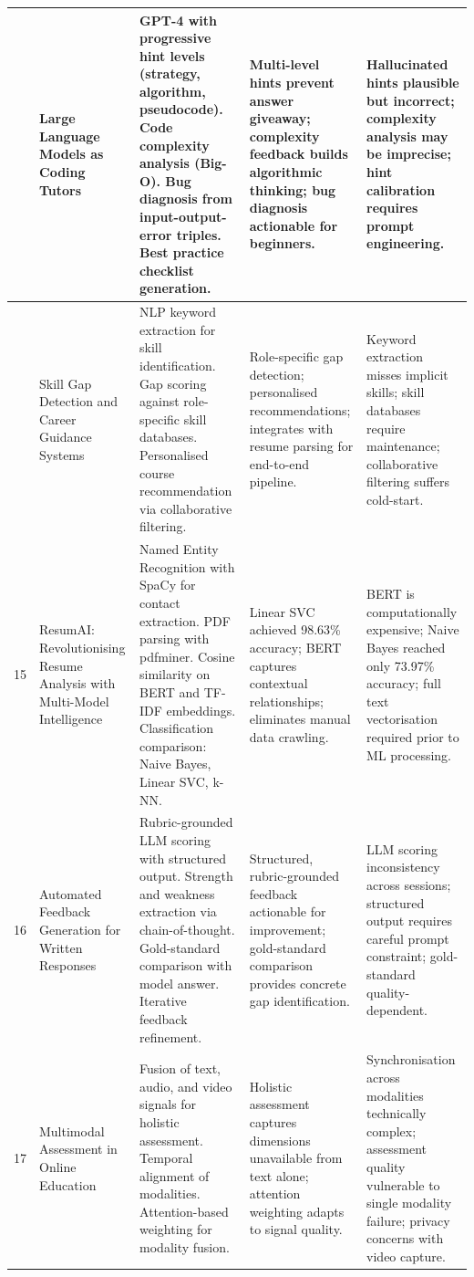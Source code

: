 \documentclass[12pt,a4paper]{report}
\begin{document}
\begin{longtable}{|>{\centering\arraybackslash}p{0.6cm}|p{3.1cm}|p{3.6cm}|p{3.2cm}|p{3.2cm}|}
13 & Large Language Models as Coding Tutors \cite{ref13} &
GPT-4 with progressive hint levels (strategy, algorithm, pseudocode). Code complexity analysis (Big-O). Bug diagnosis from input-output-error triples. Best practice checklist generation. &
Multi-level hints prevent answer giveaway; complexity feedback builds algorithmic thinking; bug diagnosis actionable for beginners. &
Hallucinated hints plausible but incorrect; complexity analysis may be imprecise; hint calibration requires prompt engineering. \\
\hline

14 & Skill Gap Detection and Career Guidance Systems \cite{ref14} &
NLP keyword extraction for skill identification. Gap scoring against role-specific skill databases. Personalised course recommendation via collaborative filtering. &
Role-specific gap detection; personalised recommendations; integrates with resume parsing for end-to-end pipeline. &
Keyword extraction misses implicit skills; skill databases require maintenance; collaborative filtering suffers cold-start. \\
\hline

15 & ResumAI: Revolutionising Resume Analysis with Multi-Model Intelligence \cite{ref15} &
Named Entity Recognition with SpaCy for contact extraction. PDF parsing with pdfminer. Cosine similarity on BERT and TF-IDF embeddings. Classification comparison: Naive Bayes, Linear SVC, k-NN. &
Linear SVC achieved 98.63\% accuracy; BERT captures contextual relationships; eliminates manual data crawling. &
BERT is computationally expensive; Naive Bayes reached only 73.97\% accuracy; full text vectorisation required prior to ML processing. \\
\hline

16 & Automated Feedback Generation for Written Responses \cite{ref16} &
Rubric-grounded LLM scoring with structured output. Strength and weakness extraction via chain-of-thought. Gold-standard comparison with model answer. Iterative feedback refinement. &
Structured, rubric-grounded feedback actionable for improvement; gold-standard comparison provides concrete gap identification. &
LLM scoring inconsistency across sessions; structured output requires careful prompt constraint; gold-standard quality-dependent. \\
\hline

17 & Multimodal Assessment in Online Education \cite{ref17} &
Fusion of text, audio, and video signals for holistic assessment. Temporal alignment of modalities. Attention-based weighting for modality fusion. &
Holistic assessment captures dimensions unavailable from text alone; attention weighting adapts to signal quality. &
Synchronisation across modalities technically complex; assessment quality vulnerable to single modality failure; privacy concerns with video capture. \\
\hline


\end{longtable}
\end{document}
